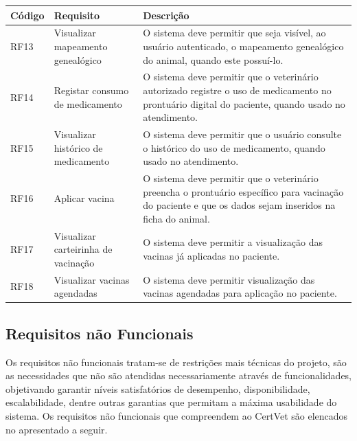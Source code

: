 \documentclass[
    12pt,               %
    openright,          %
    oneside,
    a4paper,            %
    BIBLATEX,           %
    TODO,               %
    english,            %
    brazil              %
    ]{ifsp-spo-inf-ctds}
\begin{document}
            \begin{center}
                \begin{table}[h]
                \centering
                \begin{tabulary}{1.0\textwidth}{|p{5em}|p{8em}|p{18em}|}
                \hline
                Código & Requisito & Descrição\\
                \hline
                RF13 & Visualizar mapeamento genealógico & O sistema deve permitir que seja visível, ao usuário autenticado, o mapeamento genealógico do animal, quando este possuí-lo.\\
                \hline
                RF14 & Registar consumo de medicamento & O sistema deve permitir que o veterinário autorizado registre o uso de medicamento no prontuário digital do paciente, quando usado no atendimento.\\
                \hline
                RF15 & Visualizar histórico de medicamento & O sistema deve permitir que o usuário consulte o histórico do uso de medicamento, quando usado no atendimento.\\
                \hline
                RF16 & Aplicar vacina & O sistema deve permitir que o veterinário preencha o prontuário específico para vacinação do paciente e que os dados sejam inseridos na ficha do animal.\\
                \hline
                RF17 & Visualizar carteirinha de vacinação & O sistema deve permitir a visualização das vacinas já aplicadas no paciente.\\
                \hline
                RF18 & Visualizar vacinas agendadas & O sistema deve permitir visualização das vacinas agendadas para aplicação no paciente.\\
                \hline
                \end{tabulary}
                \end{table}
            \end{center}

        \subsection{Requisitos não Funcionais}

            Os requisitos não funcionais tratam-se de restrições mais técnicas do projeto, são as necessidades que não são atendidas necessariamente através de funcionalidades, objetivando garantir níveis satisfatórios  de desempenho, disponibilidade, escalabilidade, dentre outras garantias que permitam a máxima usabilidade do sistema. Os requisitos não funcionais que compreendem ao CertVet são elencados no apresentado a seguir.
\end{document}
